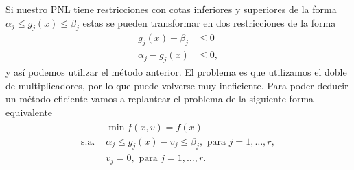 Si nuestro PNL tiene restricciones con cotas inferiores y superiores de la forma \(\alpha_{j} \leq g_{j}(x) \leq \beta_{j}\) estas se pueden transformar en dos restricciones de la forma
\begin{align*}
	g_{j}(x) - \beta_{j}	&\leq 0 \\
	\alpha_{j}-g_{j}(x)		&\leq 0,
\end{align*}
y así podemos utilizar el método anterior. El problema es que utilizamos el doble de multiplicadores, por lo que puede volverse muy ineficiente. Para poder deducir un método eficiente vamos a replantear el problema de la siguiente forma equivalente
\begin{align*}
					& \min \bar{f}(x,v) = f(x) \\
	\text{s.a. }	& \alpha_{j} \leq g_{j}(x)-v_{j} \leq \beta_{j}, \text{ para } j = 1, \dotsc, r, \\
					& v_{j} = 0, \text{ para } j = 1, \dotsc, r.
\end{align*}

